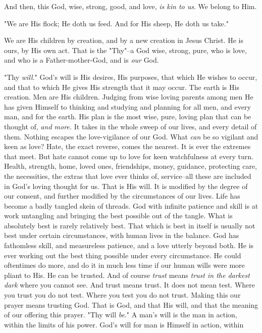 And then, this God, wise, strong, good, and love, \textit{is kin to us}. We
belong to Him.

    "We are His flock;
    He doth us feed.
    And for His sheep,
    He doth us take."

We are His children by creation, and by a new creation in Jesus Christ. He
is ours, by His own act. That is the "Thy"--a God wise, strong, pure, who
is love, and who is a Father-mother-God, and is \textit{our} God.

"Thy \textit{will}." God's will is His desires, His purposes, that which He
wishes to occur, and that to which He gives His strength that it may
occur. The earth is His creation. Men are His children. Judging from wise
loving parents among men He has given Himself to thinking and studying and
planning for all men, and every man, and for the earth. His plan is the
most wise, pure, loving plan that can be thought of, \textit{and more.} It takes
in the whole sweep of our lives, and every detail of them. Nothing escapes
the love-vigilance of our God. What \textit{can} be so vigilant and keen as love?
Hate, the exact reverse, comes the nearest. It is ever the extremes that
meet. But hate cannot come up to love for keen watchfulness at every
turn. Health, strength, home, loved ones, friendships, money, guidance,
protecting care, the necessities, the extras that love ever thinks of,
service--all these are included in God's loving thought for us. That is
His will. It is modified by the degree of our consent, and further
modified by the circumstances of our lives. Life has become a badly
tangled skein of threads. God with infinite patience and skill is at work
untangling and bringing the best possible out of the tangle. What is
absolutely best is rarely relatively best. That which is best in itself is
usually not best under certain circumstances, with human lives in the
balance. God has fathomless skill, and measureless patience, and a love
utterly beyond both. He is ever working out the best thing possible under
every circumstance. He could oftentimes do more, and do it in much less
time if our human wills were more pliant to His. He can be trusted. And of
course \textit{trust} means \textit{trust in the darkest dark} where you cannot see. And
trust means trust. It does not mean test. Where you trust you do not test.
Where you test you do not trust. Making this our prayer means trusting
God. That is God, and that His will, and that the meaning of our offering
this prayer. "Thy will \textit{be}." A man's will is the man in action, within
the limits of his power. God's will for man is Himself in action, within
